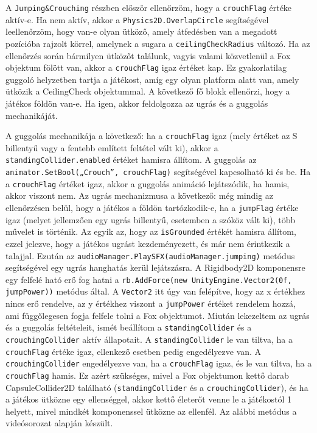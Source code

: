 A \texttt{Jumping\&Crouching} részben először ellenőrzöm, hogy a \texttt{crouchFlag} értéke aktív-e. Ha nem aktív, akkor a \texttt{Physics2D.OverlapCircle} segítségével leellenőrzöm, hogy van-e olyan ütköző, amely átfedésben van a megadott pozícióba rajzolt körrel, amelynek a sugara a \texttt{ceilingCheckRadius} változó. Ha az ellenőrzés során bármilyen ütközőt találunk, vagyis valami közvetlenül a Fox objektum fölött van, akkor a \texttt{crouchFlag} igaz értéket kap. Ez gyakorlatilag guggoló helyzetben tartja a játékost, amíg egy olyan platform alatt van, amely ütközik a CeilingCheck objektummal. A következő fő blokk ellenőrzi, hogy a játékos földön van-e. Ha igen, akkor feldolgozza az ugrás és a guggolás mechanikáját.

 A guggolás mechanikája a következő: ha a \texttt{crouchFlag} igaz (mely értéket az S billentyű vagy a fentebb említett feltétel vált ki), akkor a \texttt{standingCollider.enabled} értéket hamisra állítom. A guggolás az \texttt{animator.SetBool(„Crouch”, crouchFlag)} segítségével kapcsolható ki és be. Ha a \texttt{crouchFlag} értéket igaz, akkor a guggolás animáció lejátszódik, ha hamis, akkor viszont nem. Az ugrás mechanizmusa a következő: még mindig az ellenőrzésen belül, hogy a játékos a földön tartózkodik-e, ha a \texttt{jumpFlag} értéke igaz (melyet jellemzően egy ugrás billentyű, esetemben a szóköz vált ki), több művelet is történik. Az egyik az, hogy az \texttt{isGrounded} értékét hamisra állítom, ezzel jelezve, hogy a játékos ugrást kezdeményezett, és már nem érintkezik a talajjal. Ezután az \texttt{audioManager.PlaySFX(audioManager.jumping)} metódus segítségével egy ugrás hanghatás kerül lejátszásra. A Rigidbody2D komponensre egy felfelé ható erő fog hatni a \texttt{rb.AddForce(new UnityEngine.Vector2(0f, jumpPower))} metódus által. A \texttt{Vector2} itt úgy van felépítve, hogy az x értékhez nincs erő rendelve, az y értékhez viszont a \texttt{jumpPower} értéket rendelem hozzá, ami függőlegesen fogja felfele tolni a Fox objektumot. Miután lekezeltem az ugrás és a guggolás feltételeit, ismét beállítom a \texttt{standingCollider} és a \texttt{crouchingCollider} aktív állapotait. A \texttt{standingCollider} le van tiltva, ha a \texttt{crouchFlag} értéke igaz, ellenkező esetben pedig engedélyezve van. A \texttt{crouchingCollider} engedélyezve van, ha a \texttt{crouchFlag} igaz, és le van tiltva, ha a \texttt{crouchFlag} hamis. Ez azért szükséges, mivel a Fox objektumon kettő darab CapsuleCollider2D található (\texttt{standingCollider} és a \texttt{crouchingCollider}), és ha a játékos ütközne egy ellenséggel, akkor kettő életerőt venne le a játékostól 1 helyett, mivel mindkét komponenssel ütközne az ellenfél. Az alábbi metódus a \cite{youtubeplaylist} videósorozat alapján készült.

